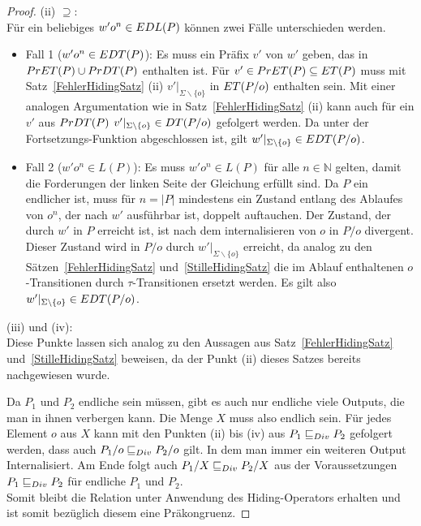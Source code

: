 \begin{proof}
  (ii)  \glqq $\supseteq$\grqq{}:\\
  Für ein beliebiges $w'o^n\in EDL (P)$ können zwei Fälle unterschieden
  werden.
  \begin{itemize}
    \item Fall 1 ($w'o^n\in EDT (P)$): Es muss ein Präfix $v'$ von $w'$ geben,
      das in $PrET (P)\cup PrDT (P)$ enthalten ist. Für $v'\in PrET (P)
      \subseteq ET (P)$ muss mit Satz~\ref{FehlerHidingSatz} (ii)
      $v'|_{\Sigma\backslash\{o\}}$ in $ET (P/o)$ enthalten sein. Mit einer
      analogen Argumentation wie in Satz~\ref{FehlerHidingSatz} (ii) kann auch
      für ein $v'$ aus $PrDT (P)$ $v'|_{\Sigma\backslash\{o\}}\in DT (P/o)$
      gefolgert werden. Da \EDT{} unter der Fortsetzungs-Funktion \cont{}
      abgeschlossen ist, gilt $w'|_{\Sigma\backslash\{o\}}\in EDT (P/o)$.
    \item Fall 2 ($w'o^n\in L (P)$): Es muss $w'o^n\in L(P)$ für alle $n\in
      \mathbb{N}$ gelten, damit die Forderungen der linken Seite der Gleichung
      erfüllt sind. Da $P$ ein endlicher \MEIO{} ist, muss für $n =|P|$
      mindestens ein Zustand entlang des Ablaufes von $o^n$, der nach $w'$
      ausführbar ist, doppelt auftauchen. Der Zustand, der durch $w'$ in $P$
      erreicht ist, ist nach dem internalisieren von $o$ in $P/o$ divergent.
      Dieser Zustand wird in $P/o$ durch $w'|_{\Sigma\backslash\{o\}}$
      erreicht, da analog zu den Sätzen~\ref{FehlerHidingSatz}
      und~\ref{StilleHidingSatz} die im Ablauf enthaltenen $o$-Transitionen
      durch $\tau$-Transitionen ersetzt werden. Es gilt also
      $w'|_{\Sigma\backslash\{o\}}\in EDT (P/o)$.
  \end{itemize}

  (iii) und (iv):\\
  Diese Punkte lassen sich analog zu den Aussagen aus
  Satz~\ref{FehlerHidingSatz} und~\ref{StilleHidingSatz} beweisen, da der Punkt
  (ii) dieses Satzes bereits nachgewiesen wurde.

  Da $P_1$ und $P_2$ endliche sein müssen, gibt es auch nur endliche viele
  Outputs, die man in ihnen verbergen kann. Die Menge $X$ muss also endlich
  sein. Für jedes Element $o$ aus $X$ kann mit den Punkten (ii) bis (iv) aus
  $P_1 \sqsubseteq  _{Div} P_2$ gefolgert werden, dass auch $P_1/o \sqsubseteq  _{Div} P_2/o$ gilt. In dem
  man immer ein weiteren Output Internalisiert. Am Ende folgt auch $P_1/X \sqsubseteq  _{Div}
  P_2/X$ aus der Voraussetzungen $P_1 \sqsubseteq  _{Div} P_2$ für endliche \MEIO{} $P_1$ und
  $P_2$.\\
  Somit bleibt die Relation \DRel{} unter Anwendung des Hiding-Operators
  erhalten und ist somit bezüglich diesem eine Präkongruenz.
\end{proof}

